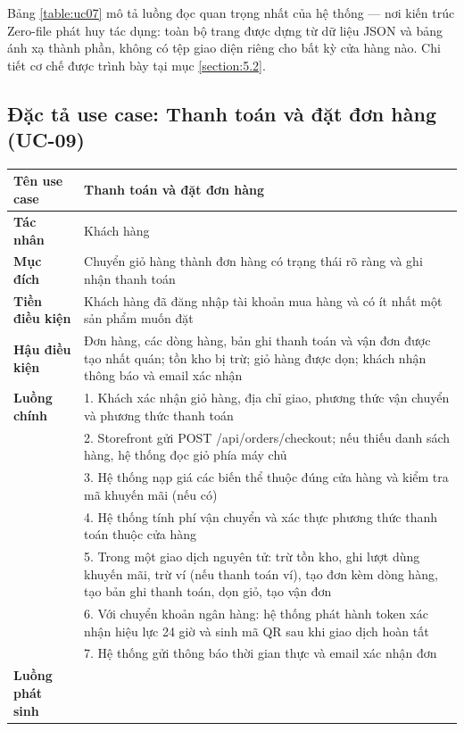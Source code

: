 \documentclass[../main.tex]{subfiles}
\begin{document}
Bảng \ref{table:uc07} mô tả luồng đọc quan trọng nhất của hệ thống --- nơi kiến trúc Zero-file phát huy tác dụng: toàn bộ trang được dựng từ dữ liệu JSON và bảng ánh xạ thành phần, không có tệp giao diện riêng cho bất kỳ cửa hàng nào. Chi tiết cơ chế được trình bày tại mục \ref{section:5.2}.

\subsection{Đặc tả use case: Thanh toán và đặt đơn hàng (UC-09)}
\label{subsection:2.3.5}

\begin{table}[H]
\centering
\begin{tabulary}{\textwidth}{|p{3cm}|L|}
  \hline
  \textbf{Tên use case} & Thanh toán và đặt đơn hàng \\ \hline
  \textbf{Tác nhân} & Khách hàng \\ \hline
  \textbf{Mục đích} & Chuyển giỏ hàng thành đơn hàng có trạng thái rõ ràng và ghi nhận thanh toán \\ \hline
  \textbf{Tiền điều kiện} & Khách hàng đã đăng nhập tài khoản mua hàng và có ít nhất một sản phẩm muốn đặt \\ \hline
  \textbf{Hậu điều kiện} & Đơn hàng, các dòng hàng, bản ghi thanh toán và vận đơn được tạo nhất quán; tồn kho bị trừ; giỏ hàng được dọn; khách nhận thông báo và email xác nhận \\ \hline
  \textbf{Luồng chính} &
    1. Khách xác nhận giỏ hàng, địa chỉ giao, phương thức vận chuyển và phương thức thanh toán \\
    & 2. Storefront gửi POST /api/orders/checkout; nếu thiếu danh sách hàng, hệ thống đọc giỏ phía máy chủ \\
    & 3. Hệ thống nạp giá các biến thể thuộc đúng cửa hàng và kiểm tra mã khuyến mãi (nếu có) \\
    & 4. Hệ thống tính phí vận chuyển và xác thực phương thức thanh toán thuộc cửa hàng \\
    & 5. Trong một giao dịch nguyên tử: trừ tồn kho, ghi lượt dùng khuyến mãi, trừ ví (nếu thanh toán ví), tạo đơn kèm dòng hàng, tạo bản ghi thanh toán, dọn giỏ, tạo vận đơn \\
    & 6. Với chuyển khoản ngân hàng: hệ thống phát hành token xác nhận hiệu lực 24 giờ và sinh mã QR sau khi giao dịch hoàn tất \\
    & 7. Hệ thống gửi thông báo thời gian thực và email xác nhận đơn \\ \hline
  \textbf{Luồng phát sinh} &

\end{tabulary}
\end{table}
\end{document}
